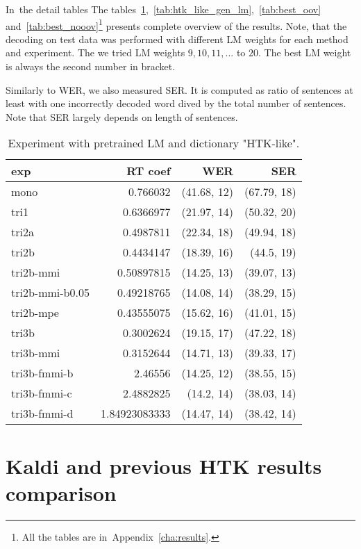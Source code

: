In~the detail tables 
The tables~\ref{tab:htk_like},~\ref{tab:htk_like_gen_lm},~\ref{tab:best_oov} 
and~\ref{tab:best_nooov}\footnote{All the tables are in~Appendix~\ref{cha:results}.} presents complete overview of the results. 
Note, that the decoding on test data was performed with different \ac{LM} weights for each method and 
experiment. The we tried \ac{LM} weights $9, 10, 11, ...$ to $20$. 
The best \ac{LM} weight is always the second number in bracket.

Similarly to \ac{WER}, we also measured \ac{SER}. It is computed as ratio of sentences at least with one incorrectly decoded word dived by the total number of sentences. Note that \ac{SER} largely depends on length of sentences. 

\begin{table}[!htp]\label{tab:htk_like}\centering\begin{tabular}{l|rrr}
exp             & RT coef       & WER         & SER        \\ 
\hline
mono            & 0.766032      & (41.68, 12) & (67.79, 18)\\ 
tri1            & 0.6366977     & (21.97, 14) & (50.32, 20)\\ 
tri2a           & 0.4987811     & (22.34, 18) & (49.94, 18)\\ 
tri2b           & 0.4434147     & (18.39, 16) & (44.5, 19) \\ 
tri2b-mmi       & 0.50897815    & (14.25, 13) & (39.07, 13)\\ 
tri2b-mmi-b0.05 & 0.49218765    & (14.08, 14) & (38.29, 15)\\ 
tri2b-mpe       & 0.43555075    & (15.62, 16) & (41.01, 15)\\ 
tri3b           & 0.3002624     & (19.15, 17) & (47.22, 18)\\ 
tri3b-mmi       & 0.3152644     & (14.71, 13) & (39.33, 17)\\ 
tri3b-fmmi-b    & 2.46556       & (14.25, 12) & (38.55, 15)\\ 
tri3b-fmmi-c    & 2.4882825     & (14.2, 14)  & (38.03, 14)\\ 
tri3b-fmmi-d    & 1.84923083333 & (14.47, 14) & (38.42, 14)
\end{tabular}
\caption{Experiment with pretrained LM and dictionary "\ac{HTK}-like".}
\end{table}  


\section[Kaldi and \ac{HTK}]{Kaldi and previous \ac{HTK} results comparison} 
\label{sec:compare}

